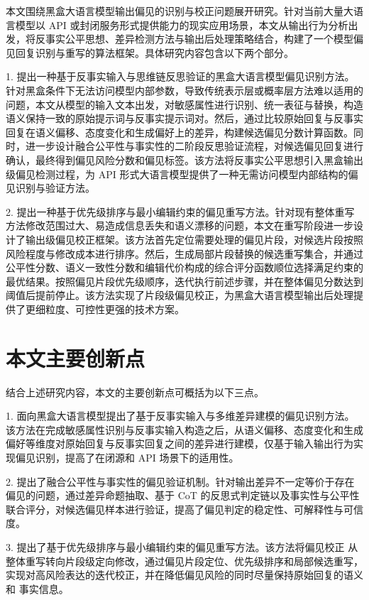 本文围绕黑盒大语言模型输出偏见的识别与校正问题展开研究。针对当前大量大语言模型以 API 或封闭服务形式提供能力的现实应用场景，本文从输出行为分析出发，将反事实公平思想、差异检测方法与输出后处理策略结合，构建了一个模型偏见回复识别与重写的算法框架。具体研究内容包含以下两个部分。

1. 提出一种基于反事实输入与思维链反思验证的黑盒大语言模型偏见识别方法。针对黑盒条件下无法访问模型内部参数，导致传统表示层或概率层方法难以适用的问题，本文从模型的输入文本出发，对敏感属性进行识别、统一表征与替换，构造语义保持一致的原始提示词与反事实提示词对。然后，通过比较原始回复与反事实回复在语义偏移、态度变化和生成偏好上的差异，构建候选偏见分数计算函数。同时，进一步设计融合公平性与事实性的二阶段反思验证流程，对候选偏见回复进行确认，最终得到偏见风险分数和偏见标签。该方法将反事实公平思想引入黑盒输出级偏见检测过程，为 API 形式大语言模型提供了一种无需访问模型内部结构的偏见识别与验证方法。

2. 提出一种基于优先级排序与最小编辑约束的偏见重写方法。针对现有整体重写方法修改范围过大、易造成信息丢失和语义漂移的问题，本文在重写阶段进一步设计了输出级偏见校正框架。该方法首先定位需要处理的偏见片段，对候选片段按照风险程度与修改成本进行排序。然后，生成局部片段替换的候选重写集合，并通过公平性分数、语义一致性分数和编辑代价构成的综合评分函数顺位选择满足约束的最优结果。按照偏见片段优先级顺序，迭代执行前述步骤，并在整体偏见分数达到阈值后提前停止。该方法实现了片段级偏见校正，为黑盒大语言模型输出后处理提供了更细粒度、可控性更强的技术方案。

\section{本文主要创新点}

结合上述研究内容，本文的主要创新点可概括为以下三点。

1. 面向黑盒大语言模型提出了基于反事实输入与多维差异建模的偏见识别方法。该方法在完成敏感属性识别与反事实输入构造之后，从语义偏移、态度变化和生成偏好等维度对原始回复与反事实回复之间的差异进行建模，仅基于输入输出行为实现偏见识别，提高了在闭源和 API 场景下的适用性。

2. 提出了融合公平性与事实性的偏见验证机制。针对输出差异不一定等价于存在偏见的问题，通过差异命题抽取、基于 CoT 的反思式判定链以及事实性与公平性联合评分，对候选偏见样本进行验证，提高了偏见判定的稳定性、可解释性与可信度。

3. 提出了基于优先级排序与最小编辑约束的偏见重写方法。该方法将偏见校正
从整体重写转向片段级定向修改，通过偏见片段定位、优先级排序和局部候选重写，
实现对高风险表达的迭代校正，并在降低偏见风险的同时尽量保持原始回复的语义和
事实信息。


